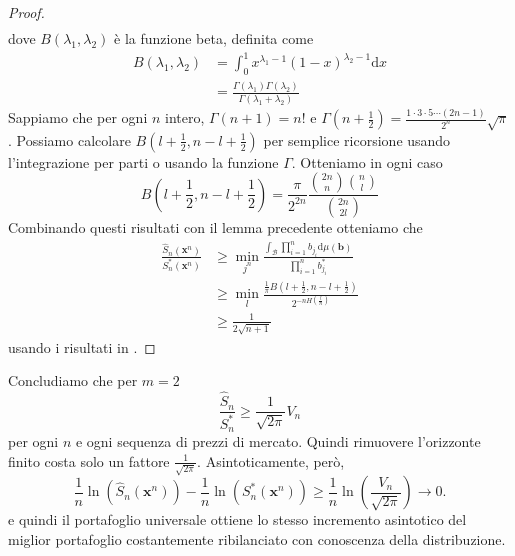 \documentclass[a4paper,11pt]{book}
\theoremstyle{plain}
\theoremstyle{definition}
\theoremstyle{remark}
\newcommand{\dx}{\text{d}x}
\newcommand{\x}{\bm{x}}
\newcommand{\B}{\bm{b}}
\newcommand{\Sh}{\hat{S}}
\newcommand{\dmu}{\text{d}\mu(\B)}
\begin{document}
\begin{proof}
\begin{equation*}
\begin{split}
		\end{split}
	\end{equation*}
	dove $B(\lambda_1,\lambda_2)$ è la funzione beta, definita come
	\begin{equation*}
		\begin{split}
		B(\lambda_1,\lambda_2) & =\int_{0}^{1}{x^{\lambda_1-1}(1-x)^{\lambda_2-1}\dx}\\
	& 	= \frac{\Gamma(\lambda_1)\Gamma(\lambda_2)}{\Gamma(\lambda_1+\lambda_2)} 
		\end{split}
	\end{equation*}
	Sappiamo che per ogni $n$ intero, $\Gamma(n+1) = n!$ e $\Gamma\left(n+\frac{1}{2}\right) = \frac{1\cdot
	3\cdot 5\cdots(2n-1)}{2^n}\sqrt{\pi}$.\newline
	Possiamo calcolare $B(l+\frac{1}{2},n-l+\frac{1}{2})$ per semplice ricorsione usando l'integrazione per parti o usando la funzione $\Gamma$. Otteniamo in ogni caso
	\begin{equation*}
		B\left(l+\frac{1}{2},n-l+\frac{1}{2}\right)=\frac{\pi}{2^{2n}}\frac{\binom{2n}{n}\binom{n}{l}}{\binom{2n}{2l}}
	\end{equation*}
	Combinando questi risultati con il lemma precedente otteniamo che
	\begin{equation*}
		\begin{split}
		\frac{\Sh_n(\x^n)}{S_n^*(\x^n)}&\geq \min\limits_{j^n}\frac{\int_\mathcal{B}{\prod_{i = 1}^n{b_{j_i}\dmu}}}{\prod_{i = 1}^n{b^*_{j_i}}}\\
		& \geq \min\limits_l \frac{\frac{1}{\pi}B\left(l+\frac{1}{2},n-l+\frac{1}{2}\right)}{2^{-nH\left(\frac{l}{n}\right)}}\\
		& \geq \frac{1}{2\sqrt{n+1}}
		\end{split}
	\end{equation*}
	usando i risultati in \cite{CoverOrden1996}.
\end{proof}
Concludiamo che per $m=2$
\begin{equation*}
	\frac{\Sh_n}{S_n^*}\geq \frac{1}{\sqrt{2\pi}}V_n
\end{equation*}
per ogni $n$ e ogni sequenza di prezzi di mercato. Quindi rimuovere l'orizzonte finito costa solo un fattore $\frac{1}{\sqrt{2\pi}}$. Asintoticamente, però,
\begin{equation*}
	\frac{1}{n}\ln(\Sh_n(\x^n))-\frac{1}{n}\ln(S_n^*(\x^n))\geq\frac{1}{n}\ln\left(\frac{V_n}{\sqrt{2\pi}}\right)\rightarrow 0.
\end{equation*}
e quindi il portafoglio universale ottiene lo stesso incremento asintotico del miglior portafoglio costantemente ribilanciato con conoscenza della distribuzione.\newline
\end{document}
